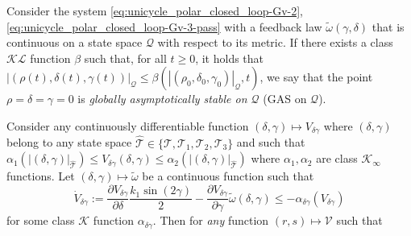 \documentclass[10pt,a4paper]{amsart}
\begin{document}
\begin{definition}
\label{def-our-GAS}
Consider the system \eqref{eq:unicycle_polar_closed_loop-Gv-2}, \eqref{eq:unicycle_polar_closed_loop-Gv-3-pass} with a feedback law $\tilde\omega(\gamma,\delta)$ that is continuous on a state space $\mathcal{Q}$ with respect to its metric. 
If there exists a class $\mathcal{KL}$ function $\beta$ such that, for all $t\geq 0$, it holds that $|(\rho(t),\delta(t), \gamma(t))|_{\mathcal{Q}}\leq \beta\left(|(\rho_0,\delta_0, \gamma_0)|_{\mathcal{Q}},t\right)$, we say that the 
point $\rho=\delta = \gamma=0$ is {\em globally asymptotically stable on $\mathcal{Q}$} (GAS on $\mathcal{Q}$). 
\end{definition}

\begin{proposition} 
\label{prop:composite_Lyap_function}
Consider 
any continuously differentiable function $(\delta,\gamma) \mapsto V_{\delta\gamma}$ where $(\delta,\gamma)$ belong to any state space $\hat{\mathcal{T}}\in\{\mathcal{T},\mathcal{T}_1,\mathcal{T}_2,\mathcal{T}_3\}$
and  such that 
$ \alpha_1(|(\delta, \gamma)|_{\hat{\mathcal{T}}}) \le V_{\delta\gamma}(\delta,\gamma) \le \alpha_2(|(\delta, \gamma)|_{\hat{\mathcal{T}}})$ where $\alpha_1, \alpha_2$ are class $\mathcal{K}_{\infty}$ functions. 
Let $(\delta,\gamma) \mapsto\tilde\omega$ be a continuous function such that 
\begin{equation}
\dot V_{\delta\gamma} := \dfrac{\partial V_{\delta\gamma}}{\partial\delta}
\frac{k_1\sin(2\gamma)}{2}  -\dfrac{\partial V_{\delta\gamma}}{\partial\gamma}\tilde\omega(\delta,\gamma) \leq -\alpha_{\delta\gamma}(V_{\delta\gamma}) \label{eq:V_dot_delta_gamma}
\end{equation}
for some class $\mathcal{K}$ function $\alpha_{\delta\gamma}$. 
Then for {\em any} function $(r,s) \mapsto \mathcal{V}$ such that 
\begin{enumerate}

\end{enumerate}
\end{proposition}
\end{document}
